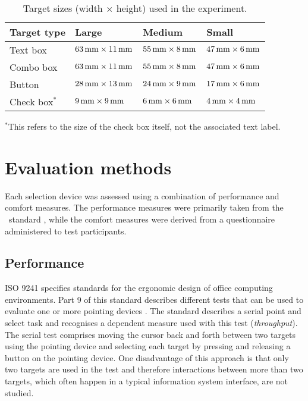 \documentclass{elsart}
\begin{document}
\begin{table}
	\caption{Target sizes (width \(\times\) height) used in the experiment.}
	\label{tab-target-sizes}
	\begin{tabular}{llll}
		\hline
		\textbf{Target type}	&	\textbf{Large}							&	\textbf{Medium}							&	\textbf{Small}	\\
		\hline
		Text box				&	\(\unit[63]{mm} \times \unit[11]{mm}\)	&	\(\unit[55]{mm} \times \unit[8]{mm}\)	&	\(\unit[47]{mm} \times \unit[6]{mm}\)	\\
		Combo box				&	\(\unit[63]{mm} \times \unit[11]{mm}\)	&	\(\unit[55]{mm} \times \unit[8]{mm}\)	&	\(\unit[47]{mm} \times \unit[6]{mm}\)	\\
		Button					&	\(\unit[28]{mm} \times \unit[13]{mm}\)	&	\(\unit[24]{mm} \times \unit[9]{mm}\)	&	\(\unit[17]{mm} \times \unit[6]{mm}\)	\\
		Check box\(^{*}\)		&	\(\unit[9]{mm} \times \unit[9]{mm}\)	&	\(\unit[6]{mm} \times \unit[6]{mm}\)	&	\(\unit[4]{mm} \times \unit[4]{mm}\)	\\
		\hline
	\end{tabular}
	
	{\footnotesize \(^{*}\)This refers to the size of the check box itself, not the associated text label.}
\end{table}


\section{Evaluation methods}
\label{sec-evaluation}

Each selection device was assessed using a combination of performance
and comfort measures. The performance measures were primarily taken from
the \ISOnine\ standard \citep{ISO-2000-9241-9}, while the comfort
measures were derived from a questionnaire administered to test
participants.


\subsection{Performance}
\label{sec-evaluation-performance}

ISO 9241 specifies standards for the ergonomic design of office
computing environments. Part 9 of this standard describes different
tests that can be used to evaluate one or more pointing devices
\citep{ISO-2000-9241-9}. The standard describes a serial point and
select task and recognises a dependent measure used with this test
(\emph{throughput}). The serial test comprises moving the cursor back
and forth between two targets using the pointing device and selecting
each target by pressing and releasing a button on the pointing device.
One disadvantage of this approach is that only two targets are used in
the test and therefore interactions between more than two targets, which
often happen in a typical information system interface, are not studied.
\end{document}
